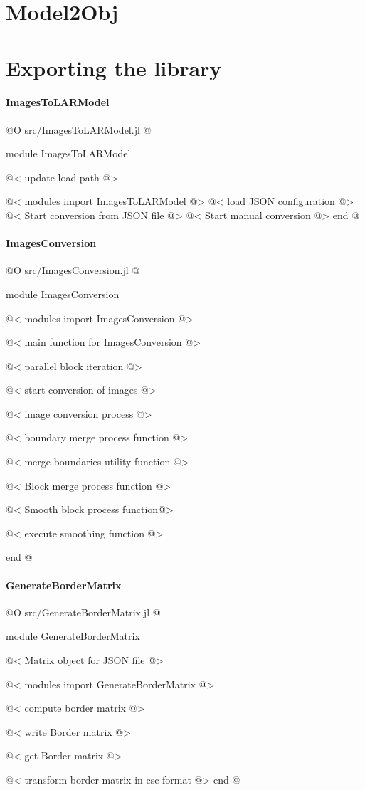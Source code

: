 \documentclass[11pt,oneside]{article}	%
\begin{document}
\section{Model2Obj}\label{sec:Model2Obj}

\section{Exporting the library}

\paragraph{ImagesToLARModel}
@O src/ImagesToLARModel.jl
@{module ImagesToLARModel

@< update load path @>

@< modules import ImagesToLARModel @>
@< load JSON configuration @>
@< Start conversion from JSON file @>
@< Start manual conversion @>
end
@}

\paragraph{ImagesConversion}
@O src/ImagesConversion.jl
@{module ImagesConversion

@< modules import ImagesConversion @>

@< main function for ImagesConversion @>

@< parallel block iteration @>

@< start conversion of images @>

@< image conversion process @>

@< boundary merge process function @>

@< merge boundaries utility function @>

@< Block merge process function @>

@< Smooth block process function@>

@< execute smoothing function @>

end
@}

\paragraph{GenerateBorderMatrix}

@O src/GenerateBorderMatrix.jl
@{module GenerateBorderMatrix

@< Matrix object for JSON file @>

@< modules import GenerateBorderMatrix @>

@< compute border matrix @>

@< write Border matrix  @>

@< get Border matrix @>

@< transform border matrix in csc format @>
end
@}
\end{document}
